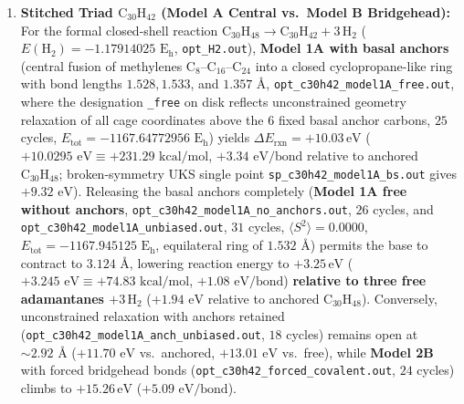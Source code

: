 \documentclass[10pt,twocolumn,a4paper]{article}
\begin{document}
\begin{enumerate}
    \item \textbf{Stitched Triad $\text{C}_{30}\text{H}_{42}$ (Model A Central vs.\ Model B Bridgehead):} For the formal closed-shell reaction $\text{C}_{30}\text{H}_{48} \to \text{C}_{30}\text{H}_{42} + 3\,\text{H}_2$ ($E(\text{H}_2) = -1.17914025\text{ E}_\text{h}$, \texttt{opt\_H2.out}), \textbf{Model 1A with basal anchors} (central fusion of methylenes $\text{C}_8\text{--C}_{16}\text{--C}_{24}$ into a closed cyclopropane-like ring with bond lengths $1.528, 1.533$, and $1.357\text{ \AA}$, \texttt{opt\_c30h42\_model1A\_free.out}, where the designation \texttt{\_free} on disk reflects unconstrained geometry relaxation of all cage coordinates above the $6$ fixed basal anchor carbons, $25$ cycles, $E_{\text{tot}} = -1167.64772956\text{ E}_\text{h}$) yields $\Delta E_{\text{rxn}} = \mathbf{+10.03}\,\text{eV}$ ($+10.0295\text{ eV} \equiv +231.29\text{ kcal/mol}$, $+3.34\text{ eV/bond}$ relative to anchored $\text{C}_{30}\text{H}_{48}$; broken-symmetry UKS single point \texttt{sp\_c30h42\_model1A\_bs.out} gives $+9.32\text{ eV}$). Releasing the basal anchors completely (\textbf{Model 1A free without anchors}, \texttt{opt\_c30h42\_model1A\_no\_anchors.out}, $26$ cycles, and \texttt{opt\_c30h42\_model1A\_unbiased.out}, $31$ cycles, $\langle S^2\rangle = 0.0000$, $E_{\text{tot}} = -1167.945125\text{ E}_\text{h}$, equilateral ring of $1.532\text{ \AA}$) permits the base to contract to $3.124\text{ \AA}$, lowering reaction energy to $\mathbf{+3.25}\,\text{eV}$ ($+3.245\text{ eV} \equiv +74.83\text{ kcal/mol}$, $+1.08\text{ eV/bond}$) \textbf{relative to three free adamantanes $+ 3\,\text{H}_2$} ($+1.94\text{ eV}$ relative to anchored $\text{C}_{30}\text{H}_{48}$). Conversely, unconstrained relaxation with anchors retained (\texttt{opt\_c30h42\_model1A\_anch\_unbiased.out}, $18$ cycles) remains open at $\sim 2.92\text{ \AA}$ ($+11.70\text{ eV}$ vs.\ anchored, $+13.01\text{ eV}$ vs.\ free), while \textbf{Model 2B} with forced bridgehead bonds (\texttt{opt\_c30h42\_forced\_covalent.out}, $24$ cycles) climbs to $\mathbf{+15.26}\,\text{eV}$ ($+5.09\text{ eV/bond}$).

\end{enumerate}
\end{document}
